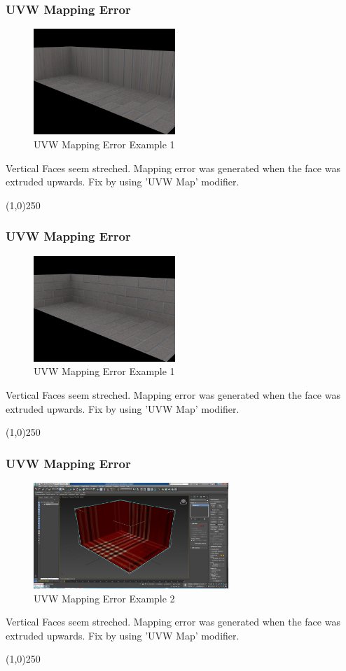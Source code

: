 \begin{frame}
\frametitle{UVW Mapping Error}
\begin{figure}
	\centering
	\includegraphics[height=4.0cm]{./MaterialsErrors/FaceError1}
	\caption{UVW Mapping Error Example 1}
	\label{fig:UVWMapError1}
\end{figure}
Vertical Faces seem streched.  Mapping error was generated when the face was extruded upwards.  Fix by using 'UVW Map' modifier.
\end{frame}
\begin{center}\line(1,0){250}\end{center}

\begin{frame}
\frametitle{UVW Mapping Error}
\begin{figure}
	\centering
	\includegraphics[height=4.0cm]{./MaterialsErrors/FaceErrorFix1}
	\caption{UVW Mapping Error Example 1}
	\label{fig:UVWMapError1}
\end{figure}
Vertical Faces seem streched.  Mapping error was generated when the face was extruded upwards.  Fix by using 'UVW Map' modifier.
\end{frame}
\begin{center}\line(1,0){250}\end{center}


\begin{frame}
\frametitle{UVW Mapping Error}
\begin{figure}
	\centering
	\includegraphics[height=4.0cm]{./MaterialsErrors/UVWError}
	\caption{UVW Mapping Error Example 2}
	\label{fig:UVWError2}
\end{figure}
Vertical Faces seem streched.  Mapping error was generated when the face was extruded upwards.  Fix by using 'UVW Map' modifier.
\end{frame}
\begin{center}\line(1,0){250}\end{center}


